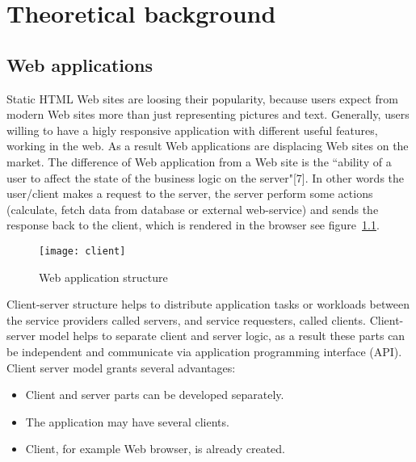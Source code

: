 \chapter{Theoretical background}
\label{ch:background} 
	\section{Web applications}
		
	  Static HTML Web sites are loosing their popularity, because users
	  expect from modern Web sites more than just representing pictures and text.
	  Generally, users willing to have a higly responsive application with different useful
	  features, working in the web. As a result Web applications are displacing Web
	  sites on the market. The difference of Web application from a Web site is the
	 ``ability of a user to affect the state of the business logic on the
	 server"[7]. In other words the user/client makes a request to the server, the
	 server perform some actions (calculate, fetch data from database or external web-service) and
	  sends the response back to the client, which is rendered in the browser see
	  figure~\ref{fig:clientserver}.
	  \begin{figure}
	  \label{fig:clientserver}
      	\texttt{[image: client]}
      	\caption{Web application structure}
      \end{figure}
	  
    	Client-server structure helps to distribute application tasks or workloads
    	between the service providers called servers, and service requesters, called
    	clients. Client-server model helps to separate client and server logic, as
    	a result these parts can be independent and communicate via application
    	programming interface (API). Client server model grants several advantages:
    	\begin{itemize}
    	  \item Client and server parts can be developed separately.
    	  \item The application may have several clients.
    	  \item Client, for example Web browser, is already created.
    	\end{itemize}
    		
